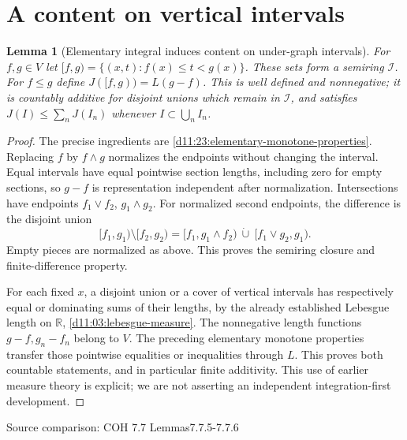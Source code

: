 \documentclass[11pt,oneside,openany]{book}
\newtheorem{lemma}[theorem]{Lemma}
\theoremstyle{definition}
\theoremstyle{remark}
\newcommand{\R}{\mathbb R}\newcommand{\C}{\mathbb C}
\newcommand{\family}[1]{}
\newcommand{\source}[1]{\par\begingroup\small\sffamily\color{black!65}Source comparison: #1\par\endgroup}
\begin{document}
\section{A content on vertical intervals}

\begin{lemma}[Elementary integral induces content on under-graph intervals]\family{D11.23.undergraph_content}\label{d11:23:undergraph-content}
For $f,g\in V$ let $[f,g)=\{(x,t):f(x)\le t<g(x)\}$. These sets form a semiring $\mathcal I$. For $f\le g$ define $J([f,g))=L(g-f)$. This is well defined and nonnegative; it is countably additive for disjoint unions which remain in $\mathcal I$, and satisfies $J(I)\le\sum_nJ(I_n)$ whenever $I\subset\bigcup_nI_n$.
\end{lemma}
\begin{proof}
The precise ingredients are \cref{d11:23:elementary-monotone-properties}. Replacing $f$ by $f\wedge g$ normalizes the endpoints without changing the interval. Equal intervals have equal pointwise section lengths, including zero for empty sections, so $g-f$ is representation independent after normalization. Intersections have endpoints $f_1\vee f_2$, $g_1\wedge g_2$. For normalized second endpoints, the difference is the disjoint union
\[[f_1,g_1)\setminus[f_2,g_2)=[f_1,g_1\wedge f_2)\ \dot\cup\ [f_1\vee g_2,g_1).
\]
Empty pieces are normalized as above. This proves the semiring closure and finite-difference property.

For each fixed $x$, a disjoint union or a cover of vertical intervals has respectively equal or dominating sums of their lengths, by the already established Lebesgue length on $\R$, \cref{d11:03:lebesgue-measure}. The nonnegative length functions $g-f,g_n-f_n$ belong to $V$. The preceding elementary monotone properties transfer those pointwise equalities or inequalities through $L$. This proves both countable statements, and in particular finite additivity. This use of earlier measure theory is explicit; we are not asserting an independent integration-first development.
\end{proof}
\source{COH 7.7 Lemmas7.7.5-7.7.6}
\end{document}
